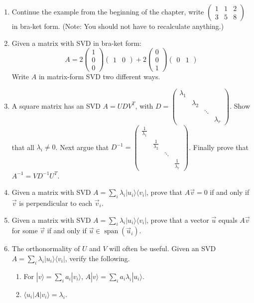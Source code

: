 \documentclass{amsbook}
\begin{document}
\begin{enumerate}
\item Continue the example from the beginning of the chapter, write $\left(
\begin{array}{ccc}
1 & 1 & 2 \\ 3 & 5 & 8
\end{array}
\right)$ in bra-ket form.  (Note: You should not have to recalculate anything.)
\item \label{rectangle_to_matrix_form} Given a matrix with SVD in bra-ket form:
$$
A=2\left(\begin{array}{c}1\\0\\0\end{array}\right)\left(\begin{array}{cc}1&0\end{array}\right) + 2\left(\begin{array}{c}0\\0\\1\end{array}\right)\left(\begin{array}{cc}0&1\end{array}\right)
$$
Write $A$ in matrix-form SVD two different ways.
\item A square matrix has an SVD $A=UDV^T$, with $D=\left(\begin{array}{cccc}\lambda_1&&&\\&\lambda_2&&\\&&\ddots&\\&&&\lambda_r\end{array}\right)$.  Show that all $\lambda_i\neq0$.  Next argue that $D^{-1}=\left(\begin{array}{cccc}\frac{1}{\lambda_1}&&&\\&\frac{1}{\lambda_2}&&\\&&\ddots&\\&&&\frac{1}{\lambda_r}\end{array}\right)$.  Finally prove that $A^{-1}=VD^{-1}U^T$.
\item \label{null_space_ex} Given a matrix with SVD $A=\sum_i\lambda_i|u_i\rangle\langle v_i|$, prove that $A\vec v=0$ if and only if $\vec v$ is perpendicular to each $\vec v_i$.
\item \label{range_ex} Given a matrix with SVD $A=\sum_i\lambda_i|u_i\rangle\langle v_i|$, prove that a vector $\vec u$ equals $A\vec v$ for some $\vec v$ if and only if $\vec u\in\operatorname{span}\left(\vec u_i\right)$.
\item The orthonormality of $U$ and $V$ will often be useful.  Given an SVD $A=\sum_i\lambda_i|u_i\rangle\langle v_i|$, verify the following.
\begin{enumerate}
\item For $|v\rangle = \sum_ia_i|v_i\rangle$, $A|v\rangle=\sum_ia_i\lambda_i|u_i\rangle$.
\item $\langle u_i|A|v_i\rangle=\lambda_i$.
\end{enumerate}
\end{enumerate}
\end{document}

